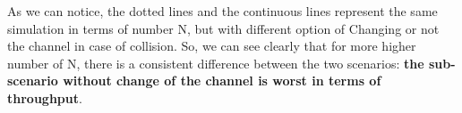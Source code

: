 As we can notice, the dotted lines and the continuous lines represent the same simulation in terms of number N, but with different option of Changing or not the channel in case of collision. So, we can see clearly that for more higher number of N, there is a consistent difference between the two scenarios: \textbf{the sub-scenario without change of the channel is worst in terms of throughput}.